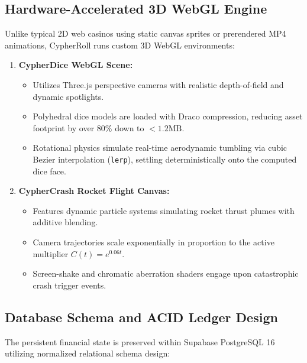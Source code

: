 \subsection{Hardware-Accelerated 3D WebGL Engine}
Unlike typical 2D web casinos using static canvas sprites or prerendered MP4 animations, CypherRoll runs custom 3D WebGL environments:
\begin{enumerate}[leftmargin=1.5em]
    \item \textbf{CypherDice WebGL Scene:}
    \begin{itemize}
        \item Utilizes Three.js perspective cameras with realistic depth-of-field and dynamic spotlights.
        \item Polyhedral dice models are loaded with Draco compression, reducing asset footprint by over $80\%$ down to $< 1.2\text{MB}$.
        \item Rotational physics simulate real-time aerodynamic tumbling via cubic Bezier interpolation (\texttt{lerp}), settling deterministically onto the computed dice face.
    \end{itemize}
    \item \textbf{CypherCrash Rocket Flight Canvas:}
    \begin{itemize}
        \item Features dynamic particle systems simulating rocket thrust plumes with additive blending.
        \item Camera trajectories scale exponentially in proportion to the active multiplier $C(t) = e^{0.06 t}$.
        \item Screen-shake and chromatic aberration shaders engage upon catastrophic crash trigger events.
    \end{itemize}
\end{enumerate}

\subsection{Database Schema and ACID Ledger Design}
The persistent financial state is preserved within Supabase PostgreSQL 16 utilizing normalized relational schema design:

